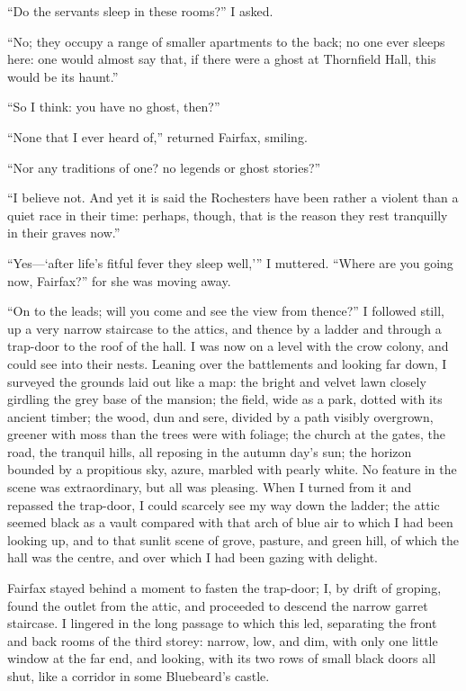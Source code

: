 \enquote{Do the servants sleep in these rooms?} I asked.

\enquote{No; they occupy a range of smaller apartments to the back; no
one ever sleeps here: one would almost say that, if there were a ghost
at Thornfield Hall, this would be its haunt.}

\enquote{So I think: you have no ghost, then?}

\enquote{None that I ever heard of,} returned \Mrs{} Fairfax, smiling.

\enquote{Nor any traditions of one? no legends or ghost stories?}

\enquote{I believe not. And yet it is said the Rochesters have been
rather a violent than a quiet race in their time: perhaps, though, that
is the reason they rest tranquilly in their graves now.}

\enquote{Yes---\enquote{after life's fitful fever they sleep well,}} I
muttered. \enquote{Where are you going now, \Mrs{} Fairfax?} for she was
moving away.

\enquote{On to the leads; will you come and see the view from thence?} 
I followed still, up a very narrow staircase to the attics, and thence
by a ladder and through a trap-door to the roof of the hall. I was now
on a level with the crow colony, and could see into their nests. 
Leaning over the battlements and looking far down, I surveyed the
grounds laid out like a map: the bright and velvet lawn closely girdling
the grey base of the mansion; the field, wide as a park, dotted with its
ancient timber; the wood, dun and sere, divided by a path visibly
overgrown, greener with moss than the trees were with foliage; the
church at the gates, the road, the tranquil hills, all reposing in the
autumn day's sun; the horizon bounded by a propitious sky, azure,
marbled with pearly white. No feature in the scene was extraordinary,
but all was pleasing. When I turned from it and repassed the trap-door,
I could scarcely see my way down the ladder; the attic seemed black as a
vault compared with that arch of blue air to which I had been looking
up, and to that sunlit scene of grove, pasture, and green hill, of which
the hall was the centre, and over which I had been gazing with delight.

\Mrs{} Fairfax stayed behind a moment to fasten the trap-door; I, by drift
of groping, found the outlet from the attic, and proceeded to descend
the narrow garret staircase. I lingered in the long passage to which
this led, separating the front and back rooms of the third storey:
narrow, low, and dim, with only one little window at the far end, and
looking, with its two rows of small black doors all shut, like a
corridor in some Bluebeard's castle.

